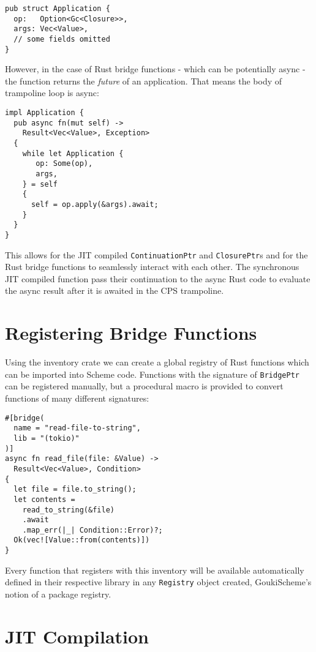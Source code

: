 \documentclass[sigplan,authordraft]{acmart}
\begin{document}
\begin{verbatim}
pub struct Application {
  op:   Option<Gc<Closure>>,
  args: Vec<Value>,
  // some fields omitted 
}
\end{verbatim}

However, in the case of Rust bridge functions - which can be potentially async -
the function returns the \textit{future} of an application. That means the body of
trampoline loop is async:

\begin{verbatim}
impl Application {
  pub async fn(mut self) ->
    Result<Vec<Value>, Exception>
  {
    while let Application {
       op: Some(op),
       args,
    } = self
    {
      self = op.apply(&args).await;
    }
  }
}
\end{verbatim}

This allows for the JIT compiled \texttt{ContinuationPtr} and
\texttt{ClosurePtr}s and for the Rust bridge functions to seamlessly interact
with each other. The synchronous JIT compiled function pass their continuation
to the async Rust code to evaluate the async result after it is awaited in the
CPS trampoline.

\section{Registering Bridge Functions}

Using the inventory\cite{inventory} crate we can create a global registry of Rust
functions which can be imported into Scheme code. Functions with the signature of
\texttt{BridgePtr} can be registered manually, but a procedural macro is provided
to convert functions of many different signatures:

\begin{verbatim}
#[bridge(
  name = "read-file-to-string",
  lib = "(tokio)"
)]
async fn read_file(file: &Value) ->
  Result<Vec<Value>, Condition>
{
  let file = file.to_string();
  let contents =
    read_to_string(&file)
    .await
    .map_err(|_| Condition::Error)?;
  Ok(vec![Value::from(contents)])
}
\end{verbatim}

Every function that registers with this inventory will be available automatically
defined in their respective library in any \texttt{Registry} object created,
GoukiScheme's notion of a package registry.

\section{JIT Compilation}
\end{document}
